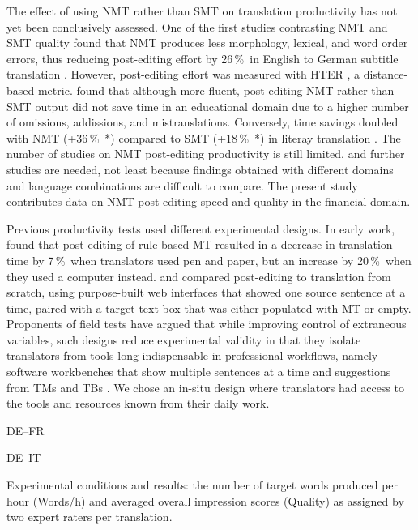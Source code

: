 \documentclass[11pt]{article}
\newcommand{\percent}{\,\%\ }
\begin{document}
The effect of using NMT rather than SMT on translation productivity has not yet been conclusively assessed. One of the first studies contrasting NMT and SMT quality found that NMT produces less morphology, lexical, and word order errors, thus reducing post-editing effort by 26\percent in English to German subtitle translation \citep{Bentivogli2016}. However, post-editing effort was measured with HTER \citep{Snover2006}, a distance-based metric. \citet{Castilho2017} found that although more fluent, post-editing NMT rather than SMT output did not save time in an educational domain due to a higher number of omissions, addissions, and mistranslations. Conversely, time savings doubled with NMT (+36\percent*) compared to SMT (+18\percent*) in literay translation \citep{Toral2018Literary}. The number of studies on NMT post-editing productivity is still limited, and further studies are needed, not least because findings obtained with different domains and language combinations are difficult to compare. The present study contributes data on NMT post-editing speed and quality in the financial domain.

Previous productivity tests used different experimental designs. In early work, \citet{Krings1994} found that post-editing of rule-based MT resulted in a decrease in translation time by 7\percent when translators used pen and paper, but an increase by 20\percent when they used a computer instead. \citet{PlittMasselot2010} and \citet{Green2013} compared post-editing to translation from scratch, using purpose-built web interfaces that showed one source sentence at a time, paired with a target text box that was either populated with MT or empty. Proponents of field tests have argued that while improving control of extraneous variables, such designs reduce experimental validity in that they isolate translators from tools long indispensable in professional workflows, namely software workbenches that show multiple sentences at a time and suggestions from TMs and TBs \citep{Federico2012,Laeubli2013}. We chose an in-situ design where translators had access to the tools and resources known from their daily work.

\begin{table*}[t]
    \centering
    \begin{subtable}[b]{0.48\textwidth}
        \centering
        \renewcommand{\arraystretch}{1.2}
    \fontsize{10.1pt}{10.1pt}\selectfont
        
        \caption{DE--FR}
        \label{tab:ResultsFR}
    \end{subtable}
    \quad
    \begin{subtable}[b]{0.48\textwidth}
        \centering
        \renewcommand{\arraystretch}{1.2}
        \fontsize{10.1pt}{10.1pt}\selectfont
        
        \caption{DE--IT}
        \label{tab:ResultsIT}
    \end{subtable}
    \caption{Experimental conditions and results: the number of target words produced per hour (Words/h) and averaged overall impression scores (Quality) as assigned by two expert raters per translation.}
    \label{tab:Results}
\end{table*}
\end{document}
